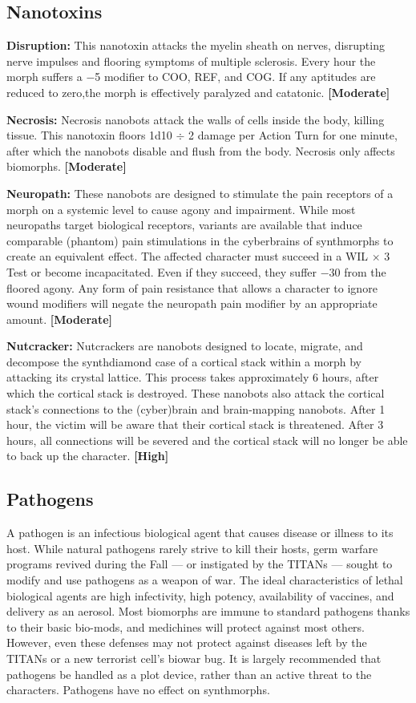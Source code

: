 \subsection{Nanotoxins}
\label{sec:nanotoxins}

\textbf{Disruption:} This nanotoxin attacks the myelin sheath on nerves, disrupting nerve impulses and flooring symptoms of multiple sclerosis. Every hour the morph suffers a $-$5 modifier to COO, REF, and COG. If any aptitudes are reduced to zero,the morph is effectively paralyzed and catatonic. \textbf{[Moderate]}

\textbf{Necrosis:} Necrosis nanobots attack the walls of cells inside the body, killing tissue. This nanotoxin floors 1d10 $\div$ 2 damage per Action Turn for one minute, after which the nanobots disable and flush from the body. Necrosis only affects biomorphs. \textbf{[Moderate]}

\textbf{Neuropath:} These nanobots are designed to stimulate the pain receptors of a morph on a systemic level to cause agony and impairment. While most neuropaths target biological receptors, variants are available that induce comparable (phantom) pain stimulations in the cyberbrains of synthmorphs to create an equivalent effect. The affected character must succeed in a WIL $\times$ 3 Test or become incapacitated. Even if they succeed, they suffer $-$30 from the floored agony. Any form of pain resistance that allows a character to ignore wound modifiers will negate the neuropath pain modifier by an appropriate amount. \textbf{[Moderate]}

\textbf{Nutcracker:} Nutcrackers are nanobots designed to locate, migrate, and decompose the synthdiamond case of a cortical stack within a morph by attacking its crystal lattice. This process takes approximately 6 hours, after which the cortical stack is destroyed. These nanobots also attack the cortical stack’s connections to the (cyber)brain and brain-mapping nanobots. After 1 hour, the victim will be aware that their cortical stack is threatened. After 3 hours, all connections will be severed and the cortical stack will no longer be able to back up the character. \textbf{[High]}


\subsection{Pathogens}
\label{sec:pathogens}

A pathogen is an infectious biological agent that causes disease or illness to its host. While natural pathogens rarely strive to kill their hosts, germ warfare programs revived during the Fall --- or instigated by the TITANs --- sought to modify and use pathogens as a weapon of war. The ideal characteristics of lethal biological agents are high infectivity, high potency, availability of vaccines, and delivery as an aerosol. Most biomorphs are immune to standard pathogens thanks to their basic bio-mods, and medichines will protect against most others. However, even these defenses may not protect against diseases left by the TITANs or a new terrorist cell’s biowar bug. It is largely recommended that pathogens be handled as a plot device, rather than an active threat to the characters. Pathogens have no effect on synthmorphs.

